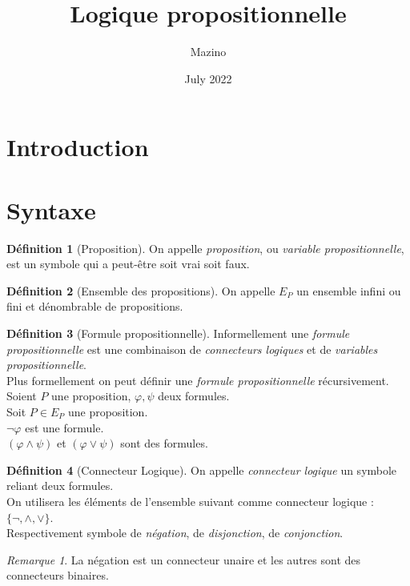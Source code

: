 \documentclass{article}
\title{Logique propositionnelle}
\author{Mazino }
\date{July 2022}
\theoremstyle{definition}
\newtheorem{definition}{Définition}[section]
\theoremstyle{remark}
\newtheorem*{remark}{Remarque}
\begin{document}
\maketitle

\section{Introduction}

\section{Syntaxe}

\begin{definition}[Proposition]
On appelle \emph{proposition}, ou \emph{variable propositionnelle}, est un symbole qui a peut-être soit vrai soit faux. 
\end{definition}

\begin{definition}[Ensemble des propositions]
On appelle $E_P$ un ensemble infini ou fini et dénombrable de propositions. 
\end{definition}


\begin{definition}[Formule propositionnelle]
Informellement une \emph{formule propositionnelle} est une combinaison de \emph{connecteurs logiques} et de  \emph{variables propositionnelle}.\\
Plus formellement on peut définir une  \emph{formule propositionnelle} récursivement.\\
Soient $P$ une proposition, $\varphi, \psi$ deux formules.\\
Soit $P \in E_P$ une proposition. \\
$\neg \varphi$ est une formule.\\
$(\varphi \land \psi)$ et $(\varphi \lor \psi)$ sont des formules.
\end{definition}

\begin{definition}[Connecteur Logique]
On appelle \emph{connecteur logique} un symbole reliant deux formules.\\ 
On utilisera les éléments de l'ensemble suivant comme connecteur logique : $\{\neg, \land, \lor  \}$.\\
Respectivement symbole de \emph{négation}, de \emph{disjonction}, de \emph{conjonction}.
\end{definition}

\begin{remark}
La négation est un connecteur unaire et les autres sont des connecteurs binaires.
\end{remark}
\end{document}
